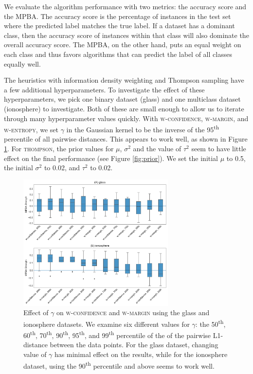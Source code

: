 \documentclass[fleqn,10pt,lineno]{wlpeerj} %
\begin{document}
We evaluate the algorithm performance with two metrics: the accuracy score and
the MPBA. The accuracy score is the percentage of instances in the test set
where the predicted label matches the true label. If a dataset has a dominant
class, then the accuracy score of instances within that class will also
dominate the overall accuracy score. The MPBA, on the other hand, puts an equal
weight on each class and thus favors algorithms that can predict the label of
all classes equally well.

The heuristics with information density weighting and Thompson sampling have a
few additional hyperparameters. To investigate the effect of these
hyperparameters, we pick one binary dataset (glass) and one multiclass dataset
(ionosphere) to investigate. Both of these are small enough to allow us to
iterate through many hyperparameter values quickly. With \textsc{w-confidence},
\textsc{w-margin}, and \textsc{w-entropy}, we set $\gamma$ in the Gaussian
kernel to be the inverse of the 95\textsuperscript{th} percentile of all
pairwise distances. This appears to work well, as shown in Figure
\ref{fig:gamma}. For \textsc{thompson}, the prior values for $\mu$, $\sigma^2$
and the value of $\tau^2$ seem to have little effect on the final performance
(see Figure \ref{fig:prior}). We set the initial $\mu$ to 0.5, the initial
$\sigma^2$ to 0.02, and $\tau^2$ to 0.02.

\begin{figure}[p]
	\centering
	\includegraphics[width=0.7\textwidth]{Fig4}
	\caption[Effect of $\gamma$ in density weighting]{Effect of $\gamma$ on
	\textsc{w-confidence} and \textsc{w-margin} using the glass and ionosphere
	datasets. We examine six different values for $\gamma$: the
	50\textsuperscript{th}, 60\textsuperscript{th}, 70\textsuperscript{th},
	90\textsuperscript{th}, 95\textsuperscript{th}, and 99\textsuperscript{th}
	percentile of the of the pairwise L1-distance between the data points. For
	the glass dataset, changing value of $\gamma$ has minimal effect on the
	results, while for the ionosphere dataset, using the 90\textsuperscript{th}
	percentile and above seems to work well.}
	\label{fig:gamma}
\end{figure}
\end{document}
